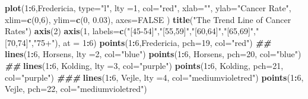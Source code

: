 \documentclass[
]{book}
\newenvironment{Shaded}{\begin{snugshade}}{\end{snugshade}}
\newcommand{\AttributeTok}[1]{\textcolor[rgb]{0.13,0.29,0.53}{#1}}
\newcommand{\ConstantTok}[1]{\textcolor[rgb]{0.56,0.35,0.01}{#1}}
\newcommand{\DecValTok}[1]{\textcolor[rgb]{0.00,0.00,0.81}{#1}}
\newcommand{\DocumentationTok}[1]{\textcolor[rgb]{0.56,0.35,0.01}{\textbf{\textit{#1}}}}
\newcommand{\FloatTok}[1]{\textcolor[rgb]{0.00,0.00,0.81}{#1}}
\newcommand{\FunctionTok}[1]{\textcolor[rgb]{0.13,0.29,0.53}{\textbf{#1}}}
\newcommand{\NormalTok}[1]{#1}
\newcommand{\SpecialCharTok}[1]{\textcolor[rgb]{0.81,0.36,0.00}{\textbf{#1}}}
\newcommand{\StringTok}[1]{\textcolor[rgb]{0.31,0.60,0.02}{#1}}
\begin{document}
\begin{Shaded}
\begin{Highlighting}[]
\FunctionTok{plot}\NormalTok{(}\DecValTok{1}\SpecialCharTok{:}\DecValTok{6}\NormalTok{,Fredericia, }\AttributeTok{type=}\StringTok{"l"}\NormalTok{, }\AttributeTok{lty =}\DecValTok{1}\NormalTok{, }\AttributeTok{col=}\StringTok{"red"}\NormalTok{, }\AttributeTok{xlab=}\StringTok{""}\NormalTok{, }
               \AttributeTok{ylab=}\StringTok{"Cancer Rate"}\NormalTok{, }\AttributeTok{xlim=}\FunctionTok{c}\NormalTok{(}\DecValTok{0}\NormalTok{,}\DecValTok{6}\NormalTok{), }\AttributeTok{ylim=}\FunctionTok{c}\NormalTok{(}\DecValTok{0}\NormalTok{, }\FloatTok{0.03}\NormalTok{), }\AttributeTok{axes=}\ConstantTok{FALSE}\NormalTok{ )}
\FunctionTok{title}\NormalTok{(}\StringTok{"The Trend Line of Cancer Rates"}\NormalTok{)}
\FunctionTok{axis}\NormalTok{(}\DecValTok{2}\NormalTok{)}
\FunctionTok{axis}\NormalTok{(}\DecValTok{1}\NormalTok{, }\AttributeTok{labels=}\FunctionTok{c}\NormalTok{(}\StringTok{"[45{-}54]"}\NormalTok{,}\StringTok{"[55,59]"}\NormalTok{,}\StringTok{"[60,64]"}\NormalTok{,}\StringTok{"[65,69]"}\NormalTok{,}\StringTok{"[70,74]"}\NormalTok{,}\StringTok{"75+"}\NormalTok{), }
            \AttributeTok{at =} \DecValTok{1}\SpecialCharTok{:}\DecValTok{6}\NormalTok{)}
\FunctionTok{points}\NormalTok{(}\DecValTok{1}\SpecialCharTok{:}\DecValTok{6}\NormalTok{,Fredericia, }\AttributeTok{pch=}\DecValTok{19}\NormalTok{, }\AttributeTok{col=}\StringTok{"red"}\NormalTok{)}
\DocumentationTok{\#\#}
\FunctionTok{lines}\NormalTok{(}\DecValTok{1}\SpecialCharTok{:}\DecValTok{6}\NormalTok{, Horsens, }\AttributeTok{lty =}\DecValTok{2}\NormalTok{, }\AttributeTok{col=}\StringTok{"blue"}\NormalTok{)}
\FunctionTok{points}\NormalTok{(}\DecValTok{1}\SpecialCharTok{:}\DecValTok{6}\NormalTok{, Horsens, }\AttributeTok{pch=}\DecValTok{20}\NormalTok{, }\AttributeTok{col=}\StringTok{"blue"}\NormalTok{)}
\DocumentationTok{\#\#}
\FunctionTok{lines}\NormalTok{(}\DecValTok{1}\SpecialCharTok{:}\DecValTok{6}\NormalTok{, Kolding, }\AttributeTok{lty =}\DecValTok{3}\NormalTok{, }\AttributeTok{col=}\StringTok{"purple"}\NormalTok{)}
\FunctionTok{points}\NormalTok{(}\DecValTok{1}\SpecialCharTok{:}\DecValTok{6}\NormalTok{, Kolding, }\AttributeTok{pch=}\DecValTok{21}\NormalTok{, }\AttributeTok{col=}\StringTok{"purple"}\NormalTok{)}
\DocumentationTok{\#\#\#}
\FunctionTok{lines}\NormalTok{(}\DecValTok{1}\SpecialCharTok{:}\DecValTok{6}\NormalTok{, Vejle, }\AttributeTok{lty =}\DecValTok{4}\NormalTok{, }\AttributeTok{col=}\StringTok{"mediumvioletred"}\NormalTok{)}
\FunctionTok{points}\NormalTok{(}\DecValTok{1}\SpecialCharTok{:}\DecValTok{6}\NormalTok{, Vejle, }\AttributeTok{pch=}\DecValTok{22}\NormalTok{, }\AttributeTok{col=}\StringTok{"mediumvioletred"}\NormalTok{)}

\end{Highlighting}
\end{Shaded}
\end{document}
